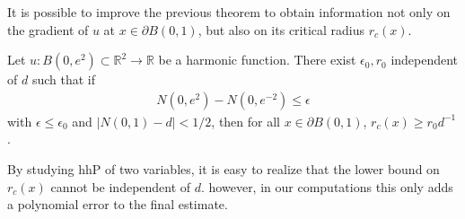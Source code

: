 \documentclass[11pt]{article}
\begin{document}
It is possible to improve the previous theorem to obtain information not only on the gradient of $u$ at $x\in \partial B(0,1)$, but also on its critical radius $r_c(x)$.
\begin{proposition}\label{prop_h2effcrit}
 Let $u:B(0,e^2)\subset {\mathbb{R}}^2\to {\mathbb{R}}$ be a harmonic function. There exist $\epsilon_0,r_0$ independent of $d$ such that if
 \begin{gather}
   N(0,e^2)-  N(0,e^{-2})\leq \epsilon
 \end{gather}
with $\epsilon \leq \epsilon_0$ and ${\left|{ N(0,1) -d }\right|}<1/2$, then for all $x\in \partial B(0,1)$, $r_c(x)\geq r_0 d^{-1}$.
\end{proposition}
\begin{remark}
 By studying hhP of two variables, it is easy to realize that the lower bound on $r_c(x)$ cannot be independent of $d$. however, in our computations this only adds a polynomial error to the final estimate.
\end{remark}
\end{document}
